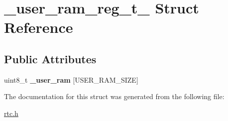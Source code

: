 \hypertarget{struct__user__ram__reg__t__}{}\section{\+\_\+user\+\_\+ram\+\_\+reg\+\_\+t\+\_\+ Struct Reference}
\label{struct__user__ram__reg__t__}
\subsection*{Public Attributes}
\begin{DoxyCompactItemize}
\item 
\mbox{\label{struct__user__ram__reg__t___ad9fb21754278b0a81f7c9a4fd544ba83}} 
uint8\+\_\+t {\bfseries \+\_\+user\+\_\+ram} \mbox{[}U\+S\+E\+R\+\_\+\+R\+A\+M\+\_\+\+S\+I\+ZE\mbox{]}
\end{DoxyCompactItemize}


The documentation for this struct was generated from the following file\+:\begin{DoxyCompactItemize}
\item 
\hyperlink{rtc_8h}{rtc.\+h}\end{DoxyCompactItemize}

